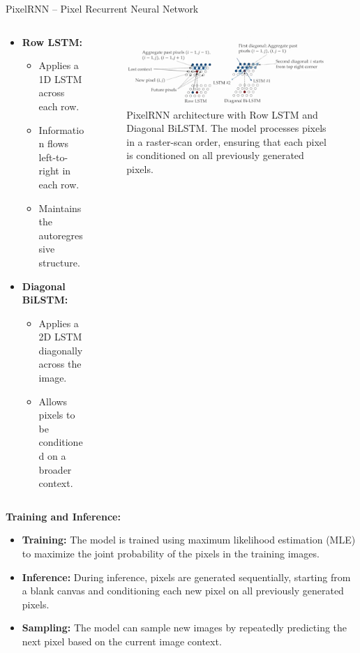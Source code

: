 \begin{frame}[allowframebreaks]{PixelRNN – Pixel Recurrent Neural Network}
\begin{columns}
\begin{column}{0.4\textwidth}
            \begin{itemize}
                \item \textbf{Row LSTM:}
                \begin{itemize}
                    \item Applies a 1D LSTM across each row.
                    \item Information flows left-to-right in each row.
                    \item Maintains the autoregressive structure.
                \end{itemize}

                \item \textbf{Diagonal BiLSTM:}
                \begin{itemize}
                    \item Applies a 2D LSTM diagonally across the image.
                    \item Allows pixels to be conditioned on a broader context.
                \end{itemize}
            \end{itemize}
        \end{column}
        \begin{column}{0.6\textwidth}
            \begin{figure}
                \centering
                \includegraphics[width=1.1\textwidth,keepaspectratio]{images/arm/pixel-rnn-networks.png}
                \caption{PixelRNN architecture with Row LSTM and Diagonal BiLSTM. The model processes pixels in a raster-scan order, ensuring that each pixel is conditioned on all previously generated pixels.}
            \end{figure}
        \end{column}
    \end{columns}

    \framebreak
    \textbf{Training and Inference:}
    \begin{itemize}
        \item \textbf{Training:} The model is trained using maximum likelihood estimation (MLE) to maximize the joint probability of the pixels in the training images.
        \item \textbf{Inference:} During inference, pixels are generated sequentially, starting from a blank canvas and conditioning each new pixel on all previously generated pixels.
        \item \textbf{Sampling:} The model can sample new images by repeatedly predicting the next pixel based on the current image context.
    \end{itemize}


\end{frame}
